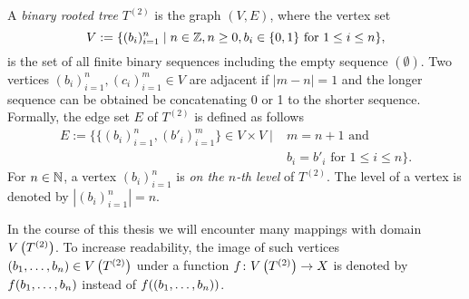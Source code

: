 
\begin{defin}\sloppypar
A \emph{binary rooted tree} $T^{(2)}$ is the graph $(V,E)$, where the vertex set 
\begin{equation*}
V:=\lbrace (b_i)_{i=1}^n\mid n\in \operatorname{\mathbb{Z}}, n\geq 0, b_i\in\lbrace 0,1\rbrace\text{ for }1\leq i\leq n\rbrace,
\end{equation*}
is the set of all finite binary sequences including the empty sequence $(\emptyset)$. Two vertices $(b_i)_{i=1}^n,(c_i)_{i=1}^m\in V$ are adjacent if $|m-n|=1$ and the longer sequence can be obtained be concatenating 0 or 1 to the shorter sequence. Formally, the edge set $E$ of $T^{(2)}$ is defined as follows
\begin{align*}
E:=\lbrace \lbrace(b_i)_{i=1}^n,(b'_i)_{i=1}^m\rbrace\in V\times V\mid& m=n+1\text{ and }\\
& b_i=b'_i\text{ for } 1\leq i\leq n\rbrace.
\end{align*}
For $n\in\operatorname{\mathbb{N}}$, a vertex $(b_i)_{i=1}^n$ is \emph{on the $n$-th level} of $T^{(2)}$. The level of a vertex  is denoted by $|(b_i)_{i=1}^n|=n.$
\end{defin}
In the course of this thesis we will encounter many mappings with domain $V\left(T^{(2)}\right)$. To increase readability, the image of such vertices $(b_{1},\ldots,b_{n})\in V\left(T^{(2)}\right)$ under a function $f\colon V\left(T^{(2)}\right)\to X$ is denoted by $f(b_{1},\ldots,b_{n})$ instead of $f((b_{1},\ldots,b_{n}))$.


